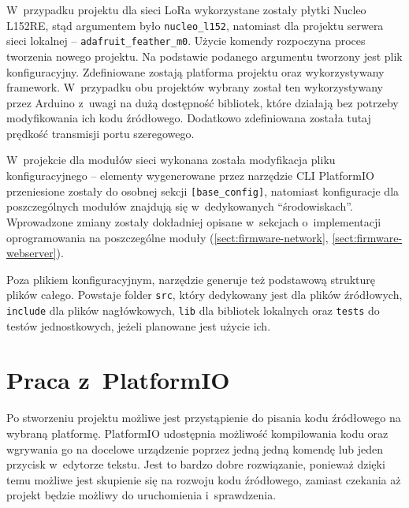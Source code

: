 W~przypadku projektu dla sieci LoRa wykorzystane zostały płytki Nucleo L152RE, stąd argumentem było
\texttt{nucleo\_l152}, natomiast dla projektu serwera sieci lokalnej -- \texttt{adafruit\_feather\_m0}. Użycie komendy
rozpoczyna proces tworzenia nowego projektu. Na podstawie podanego argumentu tworzony jest plik konfiguracyjny.
Zdefiniowane zostają platforma projektu oraz wykorzystywany framework. W~przypadku obu projektów wybrany został ten
wykorzystywany przez Arduino z~uwagi na dużą dostępność bibliotek, które działają bez potrzeby modyfikowania ich kodu
źródłowego. Dodatkowo zdefiniowana została tutaj prędkość transmisji portu szeregowego.

W~projekcie dla modułów sieci wykonana została modyfikacja pliku konfiguracyjnego -- elementy wygenerowane przez
narzędzie CLI PlatformIO przeniesione zostały do osobnej sekcji \texttt{[base\_config]}, natomiast konfiguracje dla
poszczególnych modułów znajdują się w~dedykowanych \enquote{środowiskach}. Wprowadzone zmiany zostały dokładniej opisane
w~sekcjach o~implementacji oprogramowania na poszczególne moduły (\ref{sect:firmware-network},
\ref{sect:firmware-webserver}).

Poza plikiem konfiguracyjnym, narzędzie generuje też podstawową strukturę plików całego. Powstaje folder \texttt{src},
który dedykowany jest dla plików źródłowych, \texttt{include} dla plików nagłówkowych, \texttt{lib} dla bibliotek
lokalnych oraz \texttt{tests} do testów jednostkowych, jeżeli planowane jest użycie ich.

\section{Praca z~PlatformIO\label{sect:pio-work}} Po stworzeniu projektu możliwe jest przystąpienie do pisania kodu
źródłowego na wybraną platformę. PlatformIO udostępnia możliwość kompilowania kodu oraz wgrywania go na docelowe
urządzenie poprzez jedną jedną komendę lub jeden przycisk w~edytorze tekstu. Jest to bardzo dobre rozwiązanie,
ponieważ dzięki temu możliwe jest skupienie się na rozwoju kodu źródłowego, zamiast czekania aż projekt będzie możliwy
do uruchomienia i~sprawdzenia.

